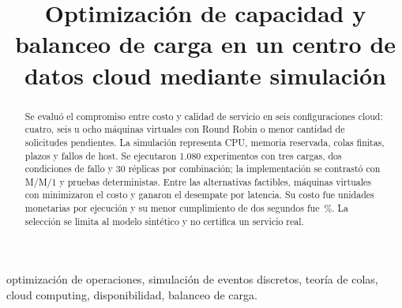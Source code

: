 \documentclass[conference,a4paper]{IEEEtran}
\begin{document}
\title{Optimización de capacidad y balanceo de carga en un centro de datos cloud mediante simulación}
\author{
\and
{}
\and
{}
}
\maketitle
\begin{abstract}
Se evaluó el compromiso entre costo y calidad de servicio en seis configuraciones cloud: cuatro, seis u ocho máquinas virtuales con Round Robin o menor cantidad de solicitudes pendientes. La simulación representa CPU, memoria reservada, colas finitas, plazos y fallos de host. Se ejecutaron 1.080 experimentos con tres cargas, dos condiciones de fallo y 30 réplicas por combinación; la implementación se contrastó con M/M/1 y pruebas deterministas. Entre las alternativas factibles, \ElegidaVM{} máquinas virtuales con \ElegidaPolitica{} minimizaron el costo y ganaron el desempate por latencia. Su costo fue \ElegidaCosto{} unidades monetarias por ejecución y su menor cumplimiento de dos segundos fue \ElegidaG{}\,\%. La selección se limita al modelo sintético y no certifica un servicio real.
\end{abstract}
\begin{IEEEkeywords}
optimización de operaciones, simulación de eventos discretos, teoría de colas, cloud computing, disponibilidad, balanceo de carga.
\end{IEEEkeywords}







\end{document}

